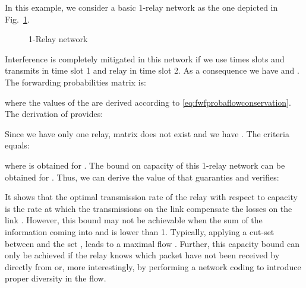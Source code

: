 \documentclass[a4paper]{article}
\begin{document}
{In this example, we consider a basic 1-relay network as the one depicted in Fig.~\ref{fig:1relay}.
\begin{figure}
\begin{center}
   \caption{1-Relay network}
\label{fig:1relay}
\end{center}
\end{figure}
Interference is completely mitigated in this network if we use  times slots and  transmits in time slot 1 and relay  in time slot 2. As a consequence we have  and . The forwarding probabilities matrix is:
  
where the values of the  are derived according to \eqref{eq:fwfprobaflowconservation}. 
The derivation of  provides:

Since we have only one relay, matrix  does not exist and we have . The criteria  equals:

\noindent where  is obtained for . The bound on capacity of this 1-relay network can be obtained for . 
Thus, we can derive the value of  that guaranties  and verifies: 

\noindent It shows that the optimal transmission rate of the relay with respect to capacity is the rate at which the transmissions on the link  compensate the losses on the link . 
However, this bound may not be achievable when the sum of the information coming into  and  is lower than 1. 
Typically, applying a cut-set between  and the set , leads to a maximal flow .
Further, this capacity bound can only be achieved if the relay knows which packet have not been received by  directly from  or, more interestingly, by performing a network coding to introduce proper diversity in the flow.    



}
\end{document}
